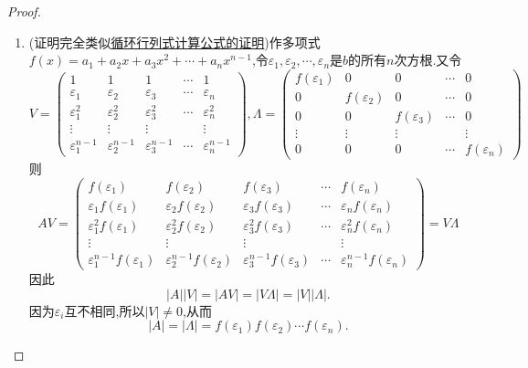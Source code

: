 \documentclass[lang=cn,newtx,10pt,scheme=chinese]{elegantbook}
\begin{document}
\begin{proof}
\begin{enumerate}[(1)]
\item (证明完全类似\hyperref[proposition:循环行列式计算公式]{循环行列式计算公式的证明})作多项式\(f(x)=a_1 + a_2x + a_3x^2+\cdots + a_nx^{n - 1}\),令\(\varepsilon_1,\varepsilon_2,\cdots,\varepsilon_n\)是\(b\)的所有\(n\)次方根.又令
\[
V = 
\begin{pmatrix}
1 & 1 & 1 & \cdots & 1\\
\varepsilon_1 & \varepsilon_2 & \varepsilon_3 & \cdots & \varepsilon_n\\
\varepsilon_1^2 & \varepsilon_2^2 & \varepsilon_3^2 & \cdots & \varepsilon_n^2\\
\vdots & \vdots & \vdots & & \vdots\\
\varepsilon_1^{n - 1} & \varepsilon_2^{n - 1} & \varepsilon_3^{n - 1} & \cdots & \varepsilon_n^{n - 1}
\end{pmatrix},
\Lambda = 
\begin{pmatrix}
f(\varepsilon_1) & 0 & 0 & \cdots & 0\\
0 & f(\varepsilon_2) & 0 & \cdots & 0\\
0 & 0 & f(\varepsilon_3) & \cdots & 0\\
\vdots & \vdots & \vdots & & \vdots\\
0 & 0 & 0 & \cdots & f(\varepsilon_n)
\end{pmatrix}
\]
则
\[
AV = 
\begin{pmatrix}
f(\varepsilon_1) & f(\varepsilon_2) & f(\varepsilon_3) & \cdots & f(\varepsilon_n)\\
\varepsilon_1f(\varepsilon_1) & \varepsilon_2f(\varepsilon_2) & \varepsilon_3f(\varepsilon_3) & \cdots & \varepsilon_nf(\varepsilon_n)\\
\varepsilon_1^2f(\varepsilon_1) & \varepsilon_2^2f(\varepsilon_2) & \varepsilon_3^2f(\varepsilon_3) & \cdots & \varepsilon_n^2f(\varepsilon_n)\\
\vdots & \vdots & \vdots & & \vdots\\
\varepsilon_1^{n - 1}f(\varepsilon_1) & \varepsilon_2^{n - 1}f(\varepsilon_2) & \varepsilon_3^{n - 1}f(\varepsilon_3) & \cdots & \varepsilon_n^{n - 1}f(\varepsilon_n)
\end{pmatrix}
= V\Lambda
\]
因此
\[
|A||V| = |AV| = |V\Lambda| = |V||\Lambda|.
\]
因为\(\varepsilon_i\)互不相同,所以\(|V|\neq0\),从而
\[
|A| = |\Lambda| = f(\varepsilon_1)f(\varepsilon_2)\cdots f(\varepsilon_n).
\]
\end{enumerate}
\end{proof}
\end{document}
